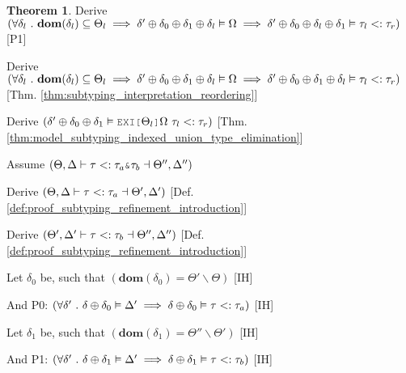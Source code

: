 \documentclass[acmsmall]{acmart}
\theoremstyle{definition}
\newtheorem{theorem}{Theorem}[section]
\begin{document}
\begin{theorem}
  \item \I\I \N Derive $(
    \forall \delta_l \ .\ 
    \textbf{dom}(\delta_l) \subseteq \Theta_l
    \implies
    \delta' \oplus \delta_0 \oplus \delta_1 \oplus \delta_l \vDash \Omega
    \implies
    \delta' \oplus \delta_0 \oplus \delta_l \oplus \delta_1 \vDash \tau_l <: \tau_r
  )$ [P1] 

  \item \I\I \N Derive $(
    \forall \delta_l \ .\ 
    \textbf{dom}(\delta_l) \subseteq \Theta_l
    \implies
    \delta' \oplus \delta_0 \oplus \delta_1 \oplus \delta_l \vDash \Omega
    \implies
    \delta' \oplus \delta_0 \oplus \delta_1 \oplus \delta_l \vDash \tau_l <: \tau_r
  )$ [Thm. \ref{thm:subtyping_interpretation_reordering}]

  \item \I\I \N Derive $(
    \delta' \oplus \delta_0 \oplus \delta_1 \satisfies \J{EXI[} \Theta_l \J{]} \Omega\ \tau_l \subtypes \tau_r
  )$ [Thm. \ref{thm:model_subtyping_indexed_union_type_elimination}]



  \item \N Assume $(
    \Theta, \Delta \entails
    \tau \subtypes \tau_{a}\J{\&}\tau_{b} \given \Theta'', \Delta''
  )$

  \item \I \N Derive $(
    \Theta, \Delta \vdash
    \tau <: \tau_{a} \dashv \Theta', \Delta' 
  )$ [Def. \ref{def:proof_subtyping_refinement_introduction}]

  \item \I \N Derive $(
    \Theta', \Delta' \vdash
    \tau <: \tau_{b} \dashv \Theta'', \Delta''
  )$ [Def. \ref{def:proof_subtyping_refinement_introduction}]

  \item \I \N Let $\delta_0$ be, such that $(
    \textbf{dom}(\delta_0) = \Theta' \backslash \Theta
  )$ [IH]
  \item \I \N And P0: $(
    \forall \delta' \ .\  
    \delta \oplus \delta_0 \vDash \Delta' 
    \implies 
    \delta \oplus \delta_0 \vDash \tau <: \tau_a
  )$ [IH]

  \item \I \N Let $\delta_1$ be, such that $(
    \textbf{dom}(\delta_1) = \Theta'' \backslash \Theta'
  )$ [IH]
  \item \I \N And P1: $(
    \forall \delta' \ .\  
    \delta \oplus \delta_1 \vDash \Delta' 
    \implies 
    \delta \oplus \delta_1 \vDash \tau <: \tau_b
  )$ [IH]


\end{theorem}
\end{document}
